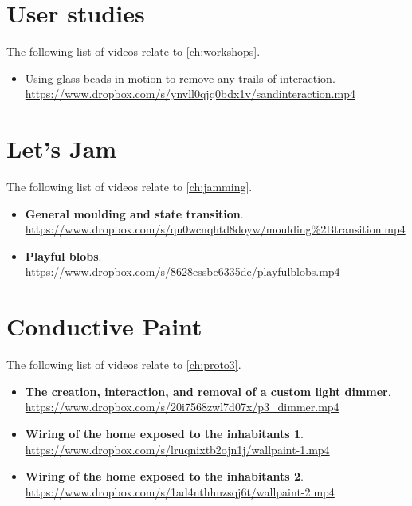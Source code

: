 \section{User studies}
\label{app:videos:workshops}

The following list of videos relate to \autoref{ch:workshops}.

\begin{itemize}
	\item{Using glass-beads in motion to remove any trails of interaction.\\
		\url{https://www.dropbox.com/s/ynvll0qjq0bdx1v/sandinteraction.mp4}}
\end{itemize}

\section{Let's Jam}
\label{app:videos:jamming}

The following list of videos relate to \autoref{ch:jamming}.

\begin{itemize}
	\item{\textbf{General moulding and state transition}. \\
		\url{https://www.dropbox.com/s/qu0wcnqhtd8doyw/moulding%2Btransition.mp4}} 
	\item{\textbf{Playful blobs}. \\
		\url{https://www.dropbox.com/s/8628essbe6335de/playfulblobs.mp4}} 
\end{itemize}

\section{Conductive Paint}
\label{app:videos:cpaint}

The following list of videos relate to \autoref{ch:proto3}.

\begin{itemize}
	\item{\textbf{The creation, interaction, and removal of a custom light dimmer}. \\
		\url{https://www.dropbox.com/s/20i7568zwl7d07x/p3_dimmer.mp4}}
	\item{\textbf{Wiring of the home exposed to the inhabitants 1}. \\
		\url{https://www.dropbox.com/s/lruqnixtb2ojn1j/wallpaint-1.mp4}}
	\item{\textbf{Wiring of the home exposed to the inhabitants 2}. \\
		\url{https://www.dropbox.com/s/1ad4nthhnzsqj6t/wallpaint-2.mp4}}
\end{itemize}